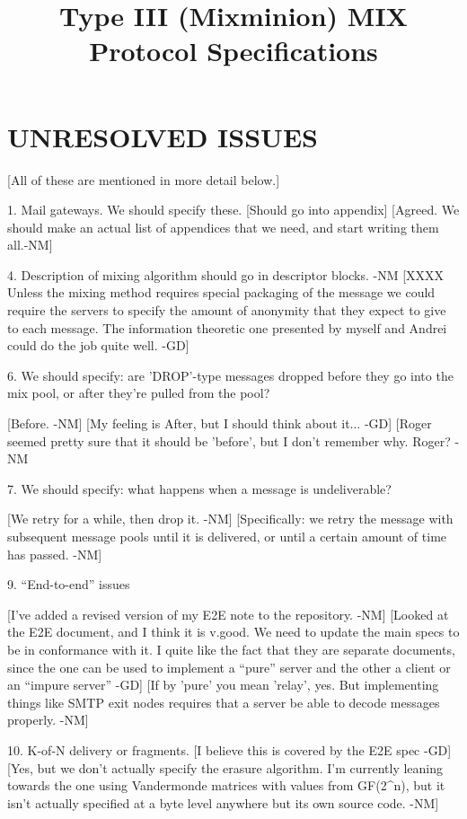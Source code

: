 \title{Type III (Mixminion) MIX Protocol Specifications}

\section{UNRESOLVED ISSUES}

[All of these are mentioned in more detail below.]

1. Mail gateways. We should specify these.
   [Should go into appendix]
   [Agreed.  We should make an actual list of appendices that we
    need, and start writing them all.-NM]

4. Description of mixing algorithm should go in descriptor blocks. -NM
   [XXXX Unless the mixing method requires special packaging of the message 
         we could require the servers to specify the amount of anonymity that
 	 they expect to give to each message. The information theoretic one
 	 presented by myself and Andrei could do the job quite well. -GD]

6. We should specify: are 'DROP'-type messages dropped before they go
    into the mix pool, or after they're pulled from the pool?

  [Before. -NM]
  [My feeling is After, but I should think about it... -GD]
  [Roger seemed pretty sure that it should be 'before', but I don't
   remember why.  Roger? -NM
   

7. We should specify: what happens when a message is undeliverable?

  [We retry for a while, then drop it. -NM]
  [Specifically: we retry the message with subsequent message pools
   until it is delivered, or until a certain amount of time has
   passed. -NM]

9. ``End-to-end'' issues

  [I've added a revised version of my E2E note to the repository. -NM]
  [Looked at the E2E document, and I think it is v.good. We need to update 
   the main specs to be in conformance with it. I quite like the fact that 
   they are separate documents, since the one can be used to implement a
   ``pure'' server and the other a client or an ``impure server'' -GD]
  [If by 'pure' you mean 'relay', yes.  But implementing things like
   SMTP exit nodes requires that a server be able to decode messages
   properly. -NM]

10. K-of-N delivery or fragments.
    [I believe this is covered by the E2E spec -GD]
    [Yes, but we don't actually specify the erasure algorithm.  I'm
     currently leaning towards the one using Vandermonde matrices with
     values from GF(2^n), but it isn't actually specified at a byte
    level anywhere but its own source code. -NM]

